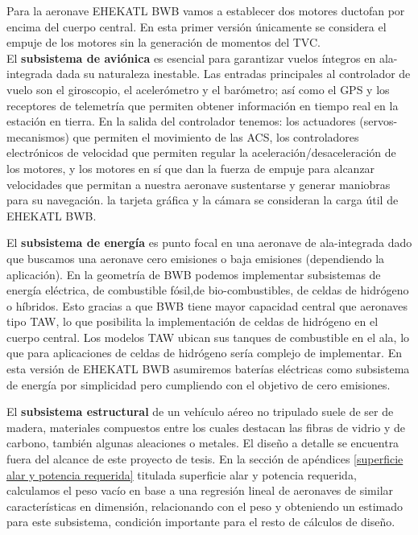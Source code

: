 Para la aeronave EHEKATL BWB vamos a establecer dos motores ductofan por encima del cuerpo central. En esta primer versión únicamente se considera el empuje de los motores sin la generación de momentos del TVC. \\
El \textbf{subsistema de aviónica} es esencial para garantizar vuelos íntegros en ala-integrada dada su naturaleza inestable.
%
Las entradas principales al controlador de vuelo son el giroscopio, el acelerómetro y el barómetro; así como el GPS y los receptores de telemetría que permiten obtener información en tiempo real en la estación en tierra. 
En la salida del controlador tenemos: los actuadores (servos-mecanismos) que permiten el movimiento de las ACS, los controladores electrónicos de velocidad que permiten regular la aceleración/desaceleración de los motores, y los motores en sí que dan la fuerza de empuje para alcanzar velocidades que permitan a nuestra aeronave sustentarse y generar maniobras para su navegación. 
%
la tarjeta gráfica y la cámara se consideran la carga útil de EHEKATL BWB.

El \textbf{subsistema de energía} es punto focal en una aeronave de ala-integrada dado que buscamos una aeronave cero emisiones o baja emisiones (dependiendo la aplicación).
%
En la geometría de BWB podemos implementar subsistemas de energía eléctrica, de combustible fósil,de bio-combustibles, de celdas de hidrógeno o híbridos. Esto gracias a que BWB tiene mayor capacidad central que aeronaves tipo TAW, lo que posibilita la implementación de celdas de hidrógeno en el cuerpo central. Los modelos TAW ubican sus tanques de combustible en el ala, lo que para aplicaciones de celdas de hidrógeno sería complejo de implementar.
%
En esta versión de EHEKATL BWB asumiremos baterías eléctricas como subsistema de energía por simplicidad pero cumpliendo con el objetivo de cero emisiones.

El \textbf{subsistema estructural} de un vehículo aéreo no tripulado suele de ser de madera, materiales compuestos entre los cuales destacan las fibras de vidrio y de carbono, también algunas aleaciones o metales. 
El diseño a detalle se encuentra fuera del alcance de este proyecto de tesis.
En la sección de apéndices \ref{superficie alar y potencia requerida} titulada superficie alar y potencia requerida, calculamos el peso vacío en base a una regresión lineal de aeronaves de similar características en dimensión, relacionando con el peso y obteniendo un estimado para este subsistema, condición importante para el resto de cálculos de diseño. 


